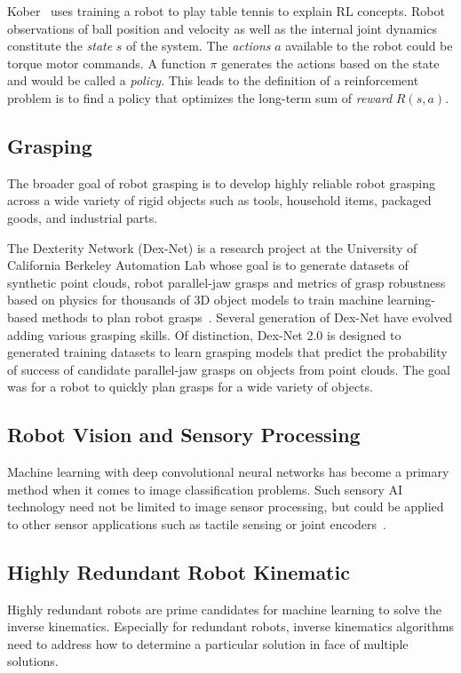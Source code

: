 Kober~\cite{kober2013reinforcement} uses training a robot to play table tennis to explain RL concepts. Robot observations of ball position and velocity as well as the internal joint dynamics constitute the \textit{state} $s$ of the system. The \textit{actions} $a$ available to the robot could be torque motor commands. A function $\pi$ generates the actions based on the state and would be called a \textit{policy}. This leads to the definition of a reinforcement problem is to find a policy that optimizes the long-term sum of \textit{reward} $R(s,a)$.



\subsection{Grasping}
The broader goal of robot grasping is to develop highly reliable robot grasping across a wide variety of rigid objects such as tools, household items, packaged goods, and industrial parts.

The Dexterity Network (Dex-Net) is a research project at the University of California Berkeley Automation Lab whose goal is to generate datasets of synthetic point clouds, robot parallel-jaw grasps and metrics of grasp robustness based on physics for thousands of 3D object models to train machine learning-based methods to plan robot grasps~\cite{mahler2017learning,dexnet}. Several generation of Dex-Net have evolved adding various grasping skills. Of distinction, Dex-Net 2.0 is designed to generated training datasets to learn grasping models that predict the probability of success of candidate parallel-jaw grasps on objects from point clouds. The goal was for a robot to quickly plan grasps for a wide variety of objects. 

\subsection{Robot Vision and Sensory Processing}
Machine learning with deep convolutional neural networks has become a primary method when it comes to image classification problems. Such  sensory AI technology need not be limited to image sensor processing, but could be applied to other sensor applications such as tactile sensing or joint encoders~\cite{bohmer2015autonomous}.



\subsection{Highly Redundant Robot Kinematic}
Highly redundant robots are prime candidates for machine learning to solve the inverse kinematics. Especially for redundant robots,  inverse kinematics algorithms need to address how to determine a particular solution in face of multiple solutions. 

